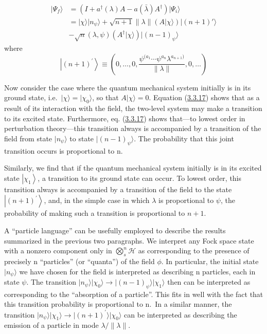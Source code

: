 \documentclass[11pt,a4paper]{article}
\providecommand{\ket}[1]{\left\lvert#1\right\rangle}
\begin{document}
\hypertarget{source-63}{}
\begin{equation*}
\begin{aligned} \lvert \Psi_{f}\rangle &= (I + a^{\dagger}(\lambda)A - a(\bar{\lambda})A^{\dagger}) \lvert \Psi_{i}\rangle \\ &= \lvert \chi\rangle\lvert n_{\psi}\rangle + \sqrt{n+1} \lVert \lambda\rVert (A\lvert \chi\rangle) \lvert (n+1)'\rangle \\ &- \sqrt{n} (\lambda, \psi) (A^{\dagger}\lvert \chi\rangle) \lvert (n-1)_{\psi}\rangle \end{aligned} \tag{3.3.17}\label{eq:3.3.17}
\end{equation*}
where
\begin{equation*}
\ket{(n+1)^{\prime}}\equiv\left(0,\ldots,0,\frac{\psi^{(a_1}\cdots\psi^{a_n}\lambda^{a_{n+1})}}{\lVert\lambda\rVert},0,\ldots\right) \tag{3.3.18}\label{eq:3.3.18}
\end{equation*}

Now consider the case where the quantum mechanical system initially is in its ground state, i.e.~\(\lvert \chi\rangle =\lvert \chi_0\rangle \), so that \(A\lvert \chi\rangle =0\). Equation (\hyperref[eq:3.3.17]{3.3.17}) shows that as a result of its interaction with the field, the two-level system may make a transition to its excited state. Furthermore, eq. (\hyperref[eq:3.3.17]{3.3.17}) shows that---to lowest order in perturbation theory---this transition always is accompanied by a transition of the field from state \(\lvert n_{\psi}\rangle \) to state \(\lvert (n-1)_{\psi}\rangle \). The probability that this joint transition occurs is proportional to n.

Similarly, we find that if the quantum mechanical system initially is in its excited state \(\ket{\chi_1}\), a transition to its ground state can occur. To lowest order, this transition always is accompanied by a transition of the field to the state \(\ket{(n+1)^{\prime}}\), and, in the simple case in which \(\lambda\) is proportional to \(\psi\), the probability of making such a transition is proportional to \(n+1\).

A ``particle language'' can be usefully employed to describe the results summarized in the previous two paragraphs. We interpret any Fock space state with a nonzero component only in \(\bigotimes_s^n\mathcal H\) as corresponding to the presence of precisely n ``particles'' (or ``quanta'') of the field \(\phi\). In particular, the initial state \(\lvert n_{\psi}\rangle\) we have chosen for the field is interpreted as describing n particles, each in state \(\psi\). The transition \(\lvert n_{\psi}\rangle\lvert \chi_0\rangle\rightarrow\lvert (n-1)_{\psi}\rangle\lvert \chi_1\rangle\) then can be interpreted as corresponding to the ``absorption of a particle''. This fits in well with the fact that this transition probability is proportional to n.~In a similar manner, the transition \(\lvert n_{\psi}\rangle\lvert \chi_1\rangle\rightarrow\lvert (n+1)^{\prime}\rangle\lvert \chi_0\rangle\) can be interpreted as describing the emission of a particle in mode \(\lambda/\lVert \lambda\rVert\).
\end{document}
